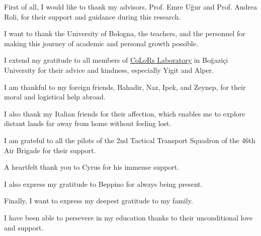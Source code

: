 \begin{acknowledgements}
First of all, I would like to thank my advisors, Prof. Emre Uğur and Prof. Andrea Roli, for their support and guidance during this research.

I want to thank the University of Bologna, the teachers, and the personnel for making this journey of academic and personal growth possible.

I extend my gratitude to all members of \href{https://colors.cmpe.boun.edu.tr}{CoLoRs Laboratory} in Boğaziçi University for their advice and kindness, especially Yigit and Alper. 

I am thankful to my foreign friends, Bahadir, Naz,  Ipek, and Zeynep, for their moral and logistical help abroad. 

I also thank my Italian friends for their affection, which enables me to explore distant lands far away from home without feeling lost. 

I am grateful to all the pilots of the 2nd Tactical Transport Squadron of the 46th Air Brigade for their support.

A heartfelt thank you to Cyrus for his immense support.  

I also express my gratitude to Beppino for always being present.

Finally, I want to express my deepest gratitude to my family. 

I have been able to persevere in my education thanks to their unconditional love and support.
\end{acknowledgements}